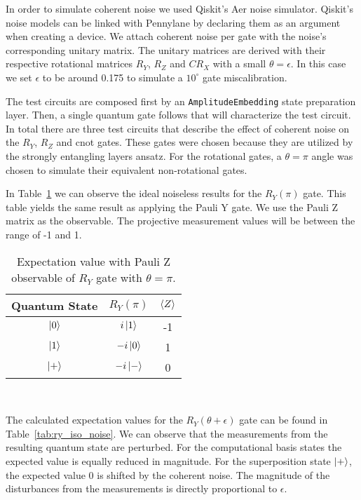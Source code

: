 In order to simulate coherent noise we used Qiskit's Aer noise simulator.
Qiskit's noise models can be linked with Pennylane by declaring them as
an argument when creating a device. We attach coherent noise per gate
with the noise's corresponding unitary matrix. The unitary matrices are
derived with their respective rotational matrices \(R_{Y}\), \(R_{Z}\) and 
\(CR_{X}\) with a small \(\theta = \epsilon\). In this case we set 
\(\epsilon\) to be around 0.175 to simulate a \(10^{\circ}\) gate
miscalibration. \

The test circuits are composed first by an
\colorbox{inline_gray}{\lstinline|AmplitudeEmbedding|} state preparation
layer. Then, a single quantum gate follows that will characterize the
test circuit. In total there are three test circuits that describe the
effect of coherent noise on the \(R_{Y}\), \(R_{Z}\) and \ac{cnot} gates.
These gates were chosen because they are utilized by the strongly
entangling layers ansatz. For the rotational gates, a \(\theta = \pi\)
angle was chosen to simulate their equivalent non-rotational gates.\

In Table~\ref{tab:ry_ideal} we can observe the ideal noiseless results
for the \(R_{Y}(\pi)\) gate. This table yields the same result as applying
the Pauli Y gate. We use the Pauli Z matrix as the observable. The 
projective measurement values will be between the range of -1 and 1.

\begin{table}[h]
  \centering
  \begin{tabular}{|c|c|c|}
    \hline
    Quantum State & \(R_{Y}\left(\pi\right)\) & \(\expval{Z}\) \\
    \hline
    \(\ket{0}\) & \(i\ket{1}\) & -1 \\
    \hline
    \(\ket{1}\) & \(-i\ket{0}\) & 1 \\
    \hline
    \(\ket{+}\) & \(-i\ket{-}\) & 0 \\
    \hline
  \end{tabular}
  \caption{Expectation value with Pauli Z observable of \(R_{Y}\) gate with \(\theta = \pi\).}\label{tab:ry_ideal}
\end{table} \

The calculated expectation values for the \(R_{Y}(\theta + \epsilon)\) gate
can be found in Table~\ref{tab:ry_iso_noise}. We can observe that the
measurements from the resulting quantum state are perturbed. For the
computational basis states the expected value is equally reduced in magnitude.
For the superposition state \(\ket{+}\), the expected value 0 is shifted
by the coherent noise. The magnitude of the disturbances from the
measurements is directly proportional to \(\epsilon\). \

